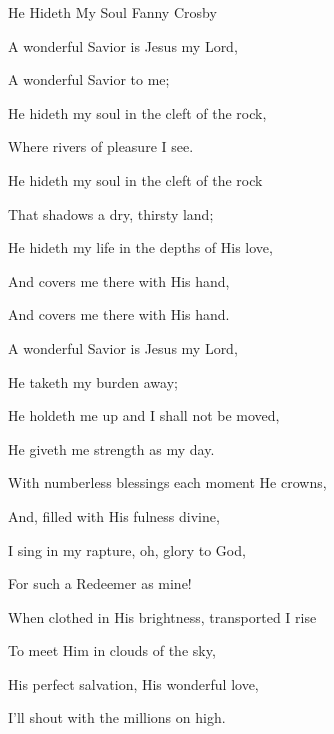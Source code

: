 \documentclass[12pt]{book}
\newcommand{\WBColBrk}{%
  \ifWordBk%
  \newpage%
\fi}
\begin{document}
\begin{song}{He Hideth My Soul}{}
  {\SBPubDom}
  {Fanny Crosby}
  {}
  {}

  \begin{SBVerse}
    A wonderful Savior is Jesus my Lord,

    A wonderful Savior to me;

    He hideth my soul in the cleft of the rock,

    Where rivers of pleasure I see.
  \end{SBVerse}

  \begin{SBOpGroup}
    He hideth my soul in the cleft of the rock

    That shadows a dry, thirsty land;

    He hideth my life in the depths of His love,

    And covers me there with His hand,

    And covers me there with His hand.
  \end{SBOpGroup}

  \begin{SBVerse}
    A wonderful Savior is Jesus my Lord,

    He taketh my burden away;

    He holdeth me up and I shall not be moved,

    He giveth me strength as my day.
  \end{SBVerse}

  \begin{SBVerse}
    With numberless blessings each moment He crowns,

    And, filled with His fulness divine,

    I sing in my rapture, oh, glory to God,

    For such a Redeemer as mine!
  \end{SBVerse}

  \begin{SBVerse}
    When clothed in His brightness, transported I rise

    To meet Him in clouds of the sky,

    His perfect salvation, His wonderful love,

    I'll shout with the millions on high.
  \end{SBVerse}
\end{song}

\WBColBrk
\end{document}
